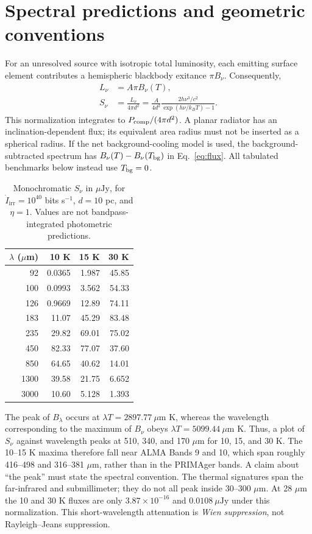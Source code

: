 \documentclass[10pt,twocolumn]{article}
\newcommand{\Iirr}{\dot I_{\mathrm{irr}}}
\newcommand{\ujy}{\mu\mathrm{Jy}}
\begin{document}
\section{Spectral predictions and geometric conventions}
For an unresolved source with isotropic total luminosity, each emitting
surface element contributes a hemispheric blackbody exitance $\pi B_\nu$.
Consequently,
\begin{align}
L_\nu &= A\pi B_\nu(T),\\
S_\nu &= \frac{L_\nu}{4\pi d^2}
       =\frac{A}{4d^2}\frac{2h\nu^3/c^2}{\exp(h\nu/k_BT)-1}.
\label{eq:flux}
\end{align}
This normalization integrates to $P_{\rm comp}/(4\pi d^2)$.
A planar radiator has an inclination-dependent flux; its equivalent
area radius must not be inserted as a spherical radius. If the net
background-cooling model is used, the background-subtracted spectrum
has $B_\nu(T)-B_\nu(T_{\rm bg})$ in Eq.~\ref{eq:flux}.
All tabulated benchmarks below instead use $T_{\rm bg}=0$.

\begin{table}[ht]
\centering
\caption{Monochromatic $S_\nu$ in $\ujy$, for $\Iirr=10^{40}$ bits
s$^{-1}$, $d=10$ pc, and $\eta=1$. Values are not bandpass-integrated
photometric predictions.}
\begin{tabular}{rrrr}
\toprule
$\lambda$ ($\mu$m) & 10 K & 15 K & 30 K\\
\midrule
92   & 0.0365 & 1.987 & 45.85\\
100  & 0.0993 & 3.562 & 54.33\\
126  & 0.9669 & 12.89 & 74.11\\
183  & 11.07 & 45.29 & 83.48\\
235  & 29.82 & 69.01 & 75.02\\
450  & 82.33 & 77.07 & 37.60\\
850  & 64.65 & 40.62 & 14.01\\
1300 & 39.58 & 21.75 & 6.652\\
3000 & 10.60 & 5.128 & 1.393\\
\bottomrule
\end{tabular}
\label{tab:flux}
\end{table}

The peak of $B_\lambda$ occurs at $\lambda T=2897.77\ \mu$m K,
whereas the wavelength corresponding to the maximum of $B_\nu$ obeys
$\lambda T=5099.44\ \mu$m K. Thus, a plot of $S_\nu$ against wavelength
peaks at 510, 340, and 170 $\mu$m for 10, 15, and 30 K. The 10--15 K
maxima therefore fall near ALMA Bands 9 and 10, which span roughly
416--498 and 316--381 $\mu$m, rather than in the PRIMAger bands.
A claim about
``the peak'' must state the spectral convention. The thermal signatures
span the far-infrared and submillimeter; they do not all peak inside
30--300 $\mu$m. At 28 $\mu$m the 10 and 30 K fluxes are only
$3.87\times10^{-16}$ and $0.0108\ \ujy$ under this normalization.
This short-wavelength attenuation is \emph{Wien suppression}, not
Rayleigh--Jeans suppression.
\end{document}
